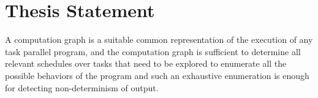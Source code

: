 \section{Thesis Statement}
A computation graph is a suitable common representation of the execution of any task parallel program, and the computation graph is sufficient to determine all relevant schedules over tasks that need to be explored to enumerate all the possible behaviors of the program and such an exhaustive enumeration is enough for detecting non-determinism of output.
